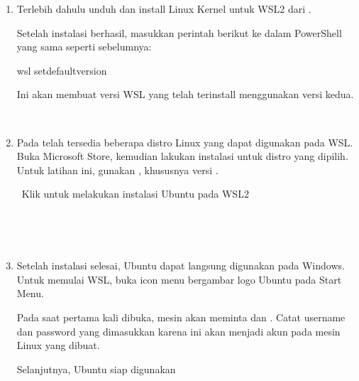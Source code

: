 \documentclass[letterpaper,10pt,english]{sphinxmanual}
\begin{document}
\begin{enumerate}
 

\item {} 

Terlebih dahulu unduh dan install Linux Kernel untuk WSL2 dari .

Setelah instalasi berhasil, masukkan perintah berikut ke dalam PowerShell yang sama seperti sebelumnya:

\begin{sphinxVerbatim}[commandchars=\\\{\}]
wsl \PYGZhy{}\PYGZhy{}set\PYGZhy{}default\PYGZhy{}version 
\end{sphinxVerbatim}

Ini akan membuat versi WSL yang telah terinstall menggunakan versi kedua.

 

\item {} 

Pada  telah tersedia beberapa distro Linux yang dapat digunakan pada WSL. Buka Microsoft Store, kemudian lakukan instalasi untuk distro yang dipilih. Untuk latihan ini, gunakan , khususnya versi .


 Klik  untuk melakukan instalasi Ubuntu pada WSL2


 

\item {} 

Setelah instalasi selesai, Ubuntu dapat langsung digunakan pada Windows. Untuk memulai WSL, buka icon menu bergambar logo Ubuntu pada Start Menu.

Pada saat pertama kali dibuka, mesin akan meminta  dan . Catat username dan password yang dimasukkan karena ini akan menjadi akun   pada mesin Linux yang dibuat.


Selanjutnya, Ubuntu siap digunakan


\end{enumerate}
\end{document}
